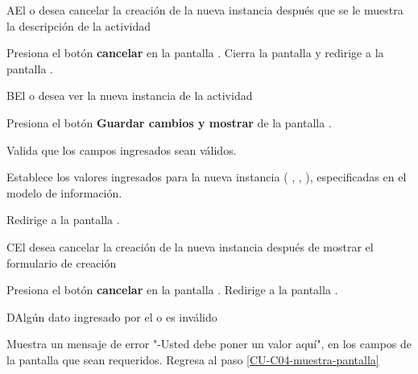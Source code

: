 \begin{UCtrayectoriaA}%
  {A}{El  o  desea cancelar la creación de la nueva instancia después que se le muestra la descripción de la actividad}

  \Actor Presiona el botón {\bf cancelar} en la pantalla .
  \Sistema Cierra la pantalla  y redirige a la pantalla .

\end{UCtrayectoriaA}

\begin{UCtrayectoriaA}{B}{El  o  desea ver la nueva instancia de la actividad}

    \Actor Presiona el botón {\bf Guardar cambios y mostrar} de la pantalla .

    \Sistema Valida que los campos ingresados sean válidos.  

    \Sistema Establece los valores ingresados para la nueva instancia  (
      ,
      ,
      ), especificadas en el modelo de información.

    \Sistema Redirige a la pantalla .

\end{UCtrayectoriaA}

\begin{UCtrayectoriaA}%
  {C}{El  desea cancelar la creación de la nueva instancia después de mostrar el formulario de creación}

  \Actor Presiona el botón {\bf cancelar} en la pantalla .
  \Sistema Redirige a la pantalla .

\end{UCtrayectoriaA}

\begin{UCtrayectoriaA}{D}{Algún dato ingresado por el  o  es inválido}

  \Sistema Muestra un mensaje de error "-Usted debe poner un valor aquí", en los campos de la pantalla  que sean requeridos.
  \Sistema Regresa al paso \ref{CU-C04-muestra-pantalla}

\end{UCtrayectoriaA}
